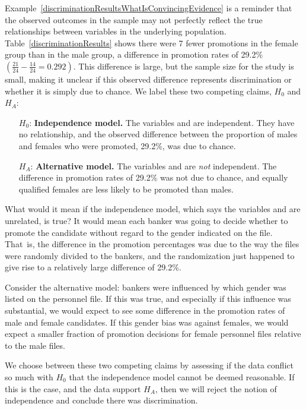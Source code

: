 Example~\ref{discriminationResultsWhatIsConvincingEvidence} is a reminder that the observed outcomes in the sample may not perfectly reflect the true relationships between variables in the underlying population. Table~\ref{discriminationResults} shows there were 7 fewer promotions in the female group than in the male group, a difference in promotion rates of 29.2\% $\left( \frac{21}{24} - \frac{14}{24} = 0.292 \right)$. This difference is large, but the sample size for the study is small, making it unclear if this observed difference represents discrimination or whether it is simply due to chance. We label these two competing claims, $H_0$ and $H_A$:
\begin{itemize}
\setlength{\itemsep}{0mm}
\item[$H_0$:] \textbf{Independence model.} The variables  and  are independent. They have no relationship, and the observed difference between the proportion of males and females who were promoted, 29.2\%, was due to chance.
\item[$H_A$:] \textbf{Alternative model.} The variables  and  are \emph{not} independent. The difference in promotion rates of 29.2\% was not due to chance, and equally qualified females are less likely to be promoted than males.
\end{itemize}

What would it mean if the independence model, which says the variables  and  are unrelated, is true? It would mean each banker was going to decide whether to promote the candidate without regard to the gender indicated on the file. That~is, the difference in the promotion percentages was due to the way the files were randomly divided to the bankers, and the randomization just happened to give rise to a relatively large difference of 29.2\%.

Consider the alternative model: bankers were influenced by which gender was listed on the personnel file. If this was true, and especially if this influence was substantial, we would expect to see some difference in the promotion rates of male and female candidates. If this gender bias was against females, we would expect a smaller fraction of promotion decisions for female personnel files relative to the male files.

We choose between these two competing claims by assessing if the data conflict so much with $H_0$ that the independence model cannot be deemed reasonable. If this is the case, and the data support $H_A$, then we will reject the notion of independence and conclude there was discrimination.


